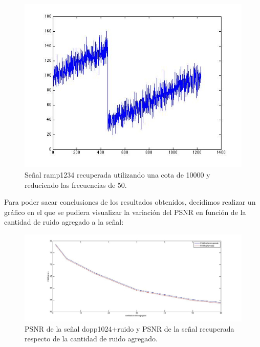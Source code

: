 \documentclass[10pt, a4paper]{article}
\begin{document}
\begin{itemize}
\begin{figure}[H] %
\begin{center}
\includegraphics[width=350pt]{./ramp1234_recu_f2.jpg}
\caption[h]{Señal ramp1234 recuperada utilizando una cota de 10000 y reduciendo las frecuencias de 50.}
\end{center}
\end{figure}

Para poder sacar conclusiones de los resultados obtenidos, decidimos realizar un gráfico en el que se pudiera visualizar la variación del PSNR en función de la cantidad de ruido agregado a la señal:

\begin{figure}[H] %
\begin{center}
\includegraphics[width=550pt]{./psnr_dopp1024_f2.jpg}
\caption[h]{PSNR de la señal dopp1024+ruido y PSNR de la señal recuperada respecto de la cantidad de ruido agregado.}
\end{center}
\end{figure}


\end{itemize}
\end{document}
